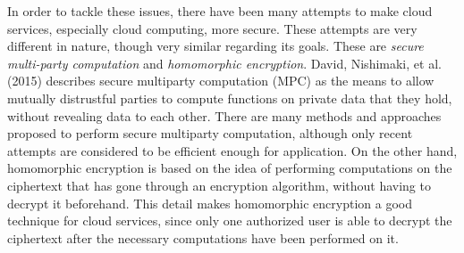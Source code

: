 In order to tackle these issues, there have been many attempts to make cloud services, especially cloud computing, more secure. These attempts are very different in nature, though very similar regarding its goals. These are \textit{secure multi-party computation} and \textit{homomorphic encryption}. David, Nishimaki, et al. (2015) \cite{cryptoeprint:2015:135} describes secure multiparty computation (MPC) as the means to allow mutually distrustful parties to compute functions on private data that they hold, without revealing data to each other. There are many methods and approaches proposed to perform secure multiparty computation, although only recent attempts are considered to be efficient enough for application. On the other hand, homomorphic encryption is based on the idea of performing computations on the ciphertext that has gone through an encryption algorithm, without having to decrypt it beforehand. This detail makes homomorphic encryption a good technique for cloud services, since only one authorized user is able to decrypt the ciphertext after the necessary computations have been performed on it.


\clearpage
